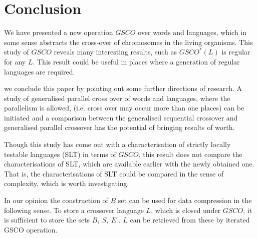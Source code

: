 \documentclass{llncs}
\begin{document}
\section{Conclusion}
We have presented a new operation $GSCO$ over words and languages,
which in some sense abstracts the cross-over of chromosomes in the
living organisms. This study of $ GSCO$ reveals many interesting
results, such as $GSCO^*(L)$  is regular for any $L$. This result
could be useful in places where a generation of regular languages
are required. \par we conclude this paper by pointing out some further directions of research.
A study of generalised parallel cross over of words and languages, where the
parallelism is allowed, (i.e. cross over may occur more than one places) can be
initiated and a comparison between the generalised sequential crossover and
generalised parallel crossover has the potential of bringing results of worth.
\par Though this study has come out with a characterisation of strictly locally
testable languages (SLT) in terms of $GSCO$, this result does not
compare the characterisations of SLT, which are available earlier
with the newly obtained one. That is, the characterisations of SLT
could be compared in the sense of complexity, which is worth
investigating.
\par In our opinion the construction of $B$ set can  be used for data compression
in the following sense. To store a
 crossover language $L$, which is closed under $GSCO$, it is sufficient to store the
sets $B,~S,~E$ . $L$ can be retrieved from these by iterated GSCO
operation.
 
\end{document}
